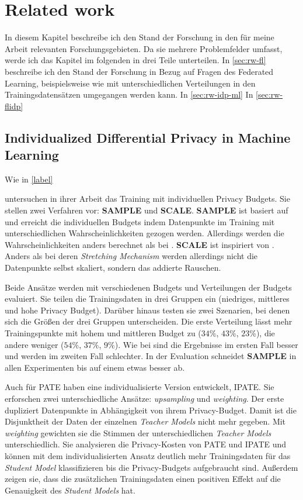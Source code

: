 \chapter{Related work}

In diesem Kapitel beschreibe ich den Stand der Forschung in den für meine Arbeit relevanten Forschungsgebieten. Da sie mehrere Problemfelder umfasst, werde ich das Kapitel im folgenden in drei Teile unterteilen. In \autoref{sec:rw-fl} beschreibe ich den Stand der Forschung in Bezug auf Fragen des Federated Learning, beispielsweise wie mit unterschiedlichen Verteilungen in den Trainingsdatensätzen umgegangen werden kann. In \autoref{sec:rw-idp-ml}
In \autoref{sec:rw-flidp}

\section{Individualized Differential Privacy in Machine Learning}\label{sec:rw-idp-ml}

Wie in \autoref{label}

\textcite{boenisch:2023} untersuchen in ihrer Arbeit das Training mit individuellen Privacy Budgets. Sie stellen zwei Verfahren vor: \textbf{SAMPLE} und \textbf{SCALE}. \textbf{SAMPLE} ist basiert auf \textcite{jorgensen:2015} und erreicht die individuellen Budgets indem Datenpunkte im Training mit unterschiedlichen Wahrscheinlichkeiten gezogen werden. Allerdings werden die Wahrscheinlichkeiten anders berechnet als bei \textcite{jorgensen:2015}. \textbf{SCALE} ist inspiriert von \textcite{alaggan:2016}. Anders als bei deren \textit{Stretching Mechanism} werden allerdings nicht die Datenpunkte selbst skaliert, sondern das addierte Rauschen. 

Beide Ansätze werden mit verschiedenen Budgets und Verteilungen der Budgets evaluiert. Sie teilen die Trainingsdaten in drei Gruppen ein (niedriges, mittleres und hohe Privacy Budget). Darüber hinaus testen sie zwei Szenarien, bei denen sich die Größen der drei Gruppen unterscheiden. Die erste Verteilung lässt mehr Trainingspunkte mit hohem und mittleren Budget zu ($34\%$, $43\%$, $23\%$), die andere weniger ($54\%$, $37\%$, $9\%$). Wie bei \textcite{jorgensen:2015} sind die Ergebnisse im ersten Fall besser und werden im zweiten Fall schlechter. In der Evaluation schneidet \textbf{SAMPLE} in allen Experimenten bis auf einem etwas besser ab.

Auch für PATE haben \textcite{boenisch:2023b} eine individualisierte Version entwickelt, IPATE. Sie erforschen zwei unterschiedliche Ansätze: \textit{upsampling} und \textit{weighting}. Der erste dupliziert Datenpunkte in Abhängigkeit von ihrem Privacy-Budget. Damit ist die Disjunktheit der Daten der einzelnen \textit{Teacher Models} nicht mehr gegeben. Mit \textit{weighting} gewichten sie die Stimmen der unterschiedlichen \textit{Teacher Models} unterschiedlich. Sie analysieren die Privacy-Kosten von PATE und IPATE und können mit dem individualisierten Ansatz deutlich mehr Trainingsdaten für das \textit{Student Model} klassifizieren bis die Privacy-Budgets aufgebraucht sind. Außerdem zeigen sie, dass die zusätzlichen Trainingsdaten einen positiven Effekt auf die Genauigkeit des \textit{Student Models} hat.

